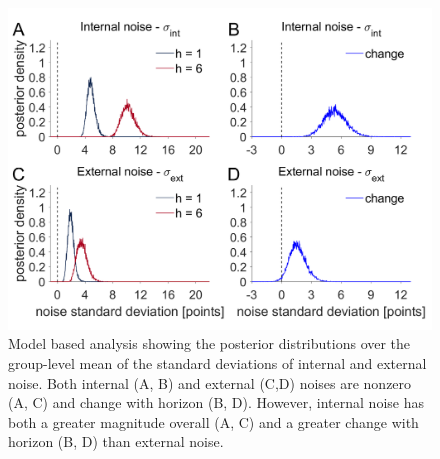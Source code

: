 \documentclass[12pt]{article}
\begin{document}
	
	\begin{figure}[H]
		\begin{center}
			\includegraphics[width=1\textwidth]{figures/hyperprior.png}
			\caption{Model based analysis showing the posterior distributions over the group-level mean of the standard deviations of  internal and external noise. Both internal (A, B) and external (C,D) noises are nonzero (A, C) and change with horizon (B, D).  However, internal noise has both a greater magnitude overall (A, C) and a greater change with horizon (B, D) than external noise.}
			\label{fig:mb1}
		\end{center}
	\end{figure}
	
	
	
	
	
	
\end{document}
